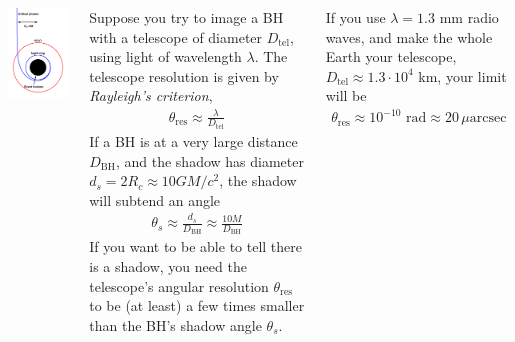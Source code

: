 \documentclass[25pt, a0paper, landscape]{tikzposter}
\begin{document}
\begin{columns}
{\begin{center}
        \vspace{1em}

        \includegraphics[width=20em]{bh-dist-fig}
      \end{center}

    }

    {
      Suppose you try to image a BH with a telescope of diameter
      $D_{\text{tel}}$, using light of wavelength $\lambda$. The
      telescope resolution is given by \emph{Rayleigh’s criterion},
      \begin{align*}
        \theta_{\text{res}} \approx \frac{\lambda}{D_{\text{tel}}}
      \end{align*}
      If a BH is at a very large distance $D_{\text{BH}}$, and the
      shadow has diameter $d_{s}=2R_{c}\approx 10GM/c^{2}$, the shadow
      will subtend an angle
      \begin{align*}
        \theta_{s} \approx \frac{d_{s}}{D_{\text{BH}}} \approx \frac{10 M}{D_{\text{BH}}}
      \end{align*}
      If you want to be able to tell there is a shadow, you need the
      telescope’s angular resolution $\theta_{\text{res}}$ to be (at
      least) a few times smaller than the BH’s shadow angle
      $\theta_{s}$.

      If you use $\lambda=1.3$ mm radio waves, and make the whole Earth
      your telescope, $D_{\text{tel}} \approx 1.3\cdot 10^{4}$ km,
      your limit will be
      \begin{align*}
        \theta_{\text{res}} \approx 10^{-10} \text{ rad} \approx 20 \,\mu\text{arcsec}
      \end{align*}

}
\end{columns}
\end{document}
